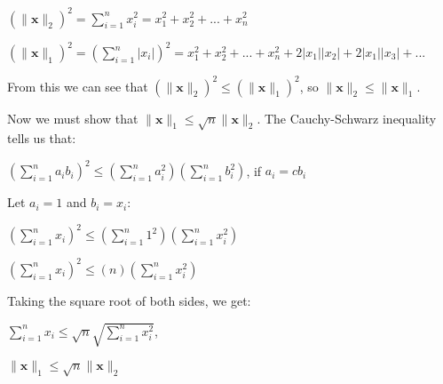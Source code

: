 \documentclass[11pt]{exam}
\theoremstyle{quest}
\begin{document}
\begin{itemize}
$(\|\textbf{x}\|_2)^2 = \sum_{i=1}^{n} x_i^2 = x_1^2 + x_2^2 + ... + x_n^2$

$(\|\textbf{x}\|_1)^2 = (\sum_{i=1}^{n} |x_i|)^2 = x_1^2 + x_2^2 + ... + x_n^2 + 2|x_1||x_2| + 2|x_1||x_3|+...$

From this we can see that $(\|\textbf{x}\|_2)^2 \leq (\|\textbf{x}\|_1)^2$, so $\|\textbf{x}\|_2 \leq \|\textbf{x}\|_1$.

Now we must show that $\|\textbf{x}\|_1 \leq \sqrt{n}\|\textbf{x}\|_2$. The Cauchy-Schwarz inequality tells us that:

$\left( \sum_{i=1}^n a_i b_i\right)^2 \leq \left( \sum_{i=1}^n a_i^2 \right) \left( \sum_{i=1}^n b_i^2 \right)$, if $a_i = c b_i$

Let $a_i = 1$ and $b_i = x_i$:

$\left( \sum_{i=1}^n x_i\right)^2 \leq \left( \sum_{i=1}^n 1^2 \right) \left( \sum_{i=1}^n x_i^2 \right)$

$\left( \sum_{i=1}^n x_i\right)^2 \leq ( n) \left( \sum_{i=1}^n x_i^2 \right)$

Taking the square root of both sides, we get:

$\sum_{i=1}^n x_i \leq \sqrt{n} \sqrt{\sum_{i=1}^{n} x_i^2}$,

$\|\textbf{x}\|_1 \leq \sqrt{n}\|\textbf{x}\|_2$

\end{itemize}

\newpage

\end{document}
